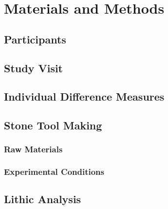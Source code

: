 \documentclass[smallextended]{svjour3}       %
\begin{document}
\hypertarget{materials-and-methods}{%
\section{\texorpdfstring{\textbf{Materials and
Methods}}{Materials and Methods}}\label{materials-and-methods}}

\hypertarget{participants}{%
\subsection{\texorpdfstring{\textbf{Participants}}{Participants}}\label{participants}}

\hypertarget{study-visit}{%
\subsection{\texorpdfstring{\textbf{Study
Visit}}{Study Visit}}\label{study-visit}}

\hypertarget{individual-difference-measures}{%
\subsection{\texorpdfstring{\textbf{Individual Difference
Measures}}{Individual Difference Measures}}\label{individual-difference-measures}}

\hypertarget{stone-tool-making}{%
\subsection{\texorpdfstring{\textbf{Stone Tool
Making}}{Stone Tool Making}}\label{stone-tool-making}}

\hypertarget{raw-materials}{%
\subsubsection{\texorpdfstring{\textbf{Raw
Materials}}{Raw Materials}}\label{raw-materials}}

\hypertarget{experimental-conditions}{%
\subsubsection{\texorpdfstring{\textbf{Experimental
Conditions}}{Experimental Conditions}}\label{experimental-conditions}}

\hypertarget{lithic-analysis}{%
\subsection{\texorpdfstring{\textbf{Lithic
Analysis}}{Lithic Analysis}}\label{lithic-analysis}}
\end{document}
